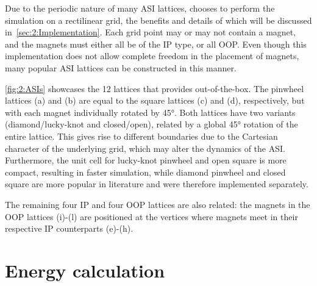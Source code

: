 Due to the periodic nature of many ASI lattices, \hotspice chooses to perform the simulation on a rectilinear grid, the benefits and details of which will be discussed in~\cref{sec:2:Implementation}.
Each grid point may or may not contain a magnet, and the magnets must either all be of the IP type, or all OOP.
Even though this implementation does not allow complete freedom in the placement of magnets, many popular ASI lattices can be constructed in this manner. \par


\cref{fig:2:ASIs} showcases the 12 lattices that \hotspice provides out-of-the-box. The pinwheel lattices (a) and (b) are equal to the square lattices (c) and (d), respectively, but with each magnet individually rotated by \ang{45}. Both lattices have two variants (diamond/lucky-knot and closed/open), related by a global \ang{45} rotation of the entire lattice. This gives rise to different boundaries due to the Cartesian character of the underlying grid, which may alter the dynamics of the ASI. Furthermore, the unit cell for lucky-knot pinwheel and open square is more compact, resulting in faster simulation, while diamond pinwheel and closed square are more popular in literature and were therefore implemented separately. \par %
The remaining four IP and four OOP lattices are also related: the magnets in the OOP lattices (i)-(l) are positioned at the vertices where magnets meet in their respective IP counterparts (e)-(h).

\section{Energy calculation}
